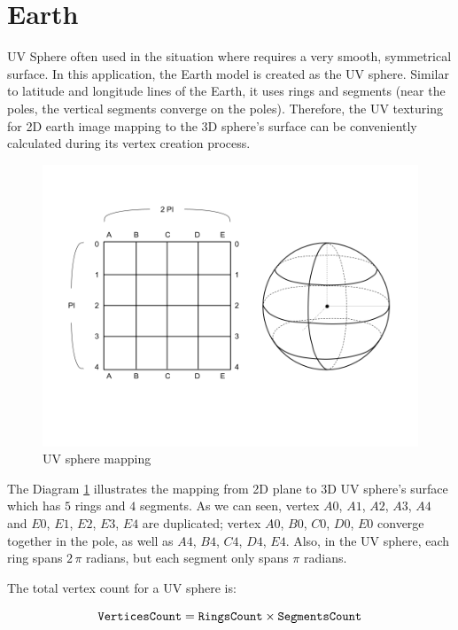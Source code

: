 \section{Earth}

UV Sphere often used in the situation where requires a very smooth, symmetrical surface. In this application, the Earth model is created as the UV sphere. Similar to latitude and longitude lines of the Earth, it uses rings and segments (near the poles, the vertical segments converge on the poles). Therefore, the UV texturing for 2D earth image mapping to the 3D sphere's surface can be conveniently calculated during its vertex creation process.

\begin{figure}[H]
\caption{UV sphere mapping}
\label{fig:uv-sphere-mapping}
\centering
\includegraphics[width=\linewidth]{Figures/uv-sphere-mapping.png}
\decoRule
\end{figure}

The Diagram \ref{fig:uv-sphere-mapping} illustrates the mapping from 2D plane to 3D UV sphere's surface which has $5$ rings and $4$ segments. As we can seen, vertex $A0$, $A1$, $A2$, $A3$, $A4$ and $E0$, $E1$, $E2$, $E3$, $E4$ are duplicated; vertex $A0$, $B0$, $C0$, $D0$, $E0$ converge together in the pole, as well as $A4$, $B4$, $C4$, $D4$, $E4$. Also, in the UV sphere, each ring spans $2\,\pi$ radians, but each segment only spans $\pi$ radians.

The total vertex count for a UV sphere is:

\begin{equation}
\label{equ:uv-sphere-vertices}
\texttt{VerticesCount} = \texttt{RingsCount} \times \texttt{SegmentsCount}
\end{equation}

